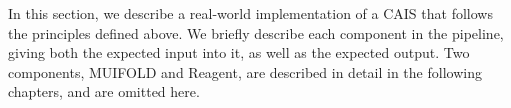 

In this section, we describe a real-world implementation of a CAIS that follows the principles
defined above. We briefly describe each component in the pipeline, giving both the expected
input into it, as well as the expected output. Two components, MUIFOLD and Reagent, are described
in detail in the following chapters, and are omitted here.
